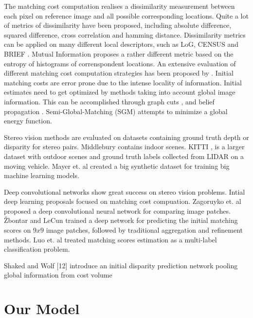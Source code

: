 \documentclass[runningheads]{llncs}
\begin{document}
The matching cost computation realises a dissimilarity measurement between each pixel on reference image and all possible corresponding locations. Quite a lot of metrics of dissimilarity have been proposed, including  absolute difference, squared difference, cross correlation and hamming distance. Dissimilarity metrics can be applied on many different local descriptors, such as LoG, CENSUS \cite{Zabih1996ACorrespondence} and BRIEF \cite{Calonder2010}. Mutual Information \cite{Viola1997} proposes a rather different metric based on the entropy of histograms of correnspondent locations. An extensive evaluation of different matching cost computation strategies has been proposed by \cite{Hirschmuller2007}. Initial matching costs are error prone due to the intense locality of information. Initial estimates need to get optimized by methods taking into account global image information. This can be accomplished through graph cuts \cite{Kolmogorov}, \cite{Boykov2001} and belief propagation \cite{Klaus2006}. Semi-Global-Matching (SGM) \cite{Hirschmuller2008StereoInformation} attempts to minimize a global energy function.

Stereo vision methods are evaluated on datasets containing ground truth depth or disparity for stereo pairs. Middlebury \cite{Scharstein2014} contains indoor scenes. KITTI \cite{Menze2015ISA}, \cite{Menze2018JPRS} is a larger dataset with outdoor scenes and ground truth labels collected from LIDAR on a moving vehicle. Mayer et. al \cite{Mayer2016ALD} created a big synthetic dataset for training big machine learning models.

Deep convolutional networks show great success on stereo vision problems. Intial deep learning proposals focused on matching cost compuation. Zagoruyko et. al \cite{Zagoruyko2015LearningNetworks} proposed a deep convolutional neural network for comparing image patches. \v{Z}bontar and LeCun \cite{Zbontar_2015_CVPR} trained a deep network for predicting the initial matching scores on $9x9$ image patches, followed by traditional aggregation and refinement methods. Luo et. al \cite{Luo2016EfficientMatching} treated matching scores estimation as a multi-label classification problem.

Shaked and Wolf [12] introduce an initial disparity prediction network pooling global information from cost volume

\section{Our Model}
\end{document}
